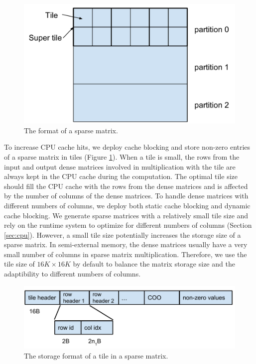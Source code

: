 \begin{figure}
\centering
\includegraphics[scale=0.3]{SpMM_figs/sparse_mat.pdf}
\caption{The format of a sparse matrix.}
\label{sparse_mat}
\end{figure}

To increase CPU cache hits, we deploy cache blocking \cite{Im04} and store
non-zero entries of a sparse matrix in tiles (Figure \ref{sparse_mat}).
When a tile is small, the rows from the input and output dense matrices
involved in multiplication with the tile are always kept in the CPU cache
during the computation. The optimal tile size should fill the CPU cache
with the rows from the dense matrices and is affected by the number of columns
of the dense matrices. To handle dense matrices with different numbers
of columns, we deploy both static cache blocking and dynamic cache blocking.
We generate sparse matrices with a relatively small tile size and
rely on the runtime system
to optimize for different numbers of columns (Section \ref{sec:cpu}).
However, a small tile size potentially increases the storage size of a sparse
matrix. In semi-external memory, the dense matrices usually have
a very small number of columns in sparse matrix multiplication. Therefore, we
use the tile size of $16K \times 16K$ by default to balance the matrix storage
size and the adaptibility to different numbers of columns.

\begin{figure}
\centering
\includegraphics[scale=0.5]{SpMM_figs/tile_format.pdf}
\caption{The storage format of a tile in a sparse matrix.}
\label{tile_format}
\end{figure}

